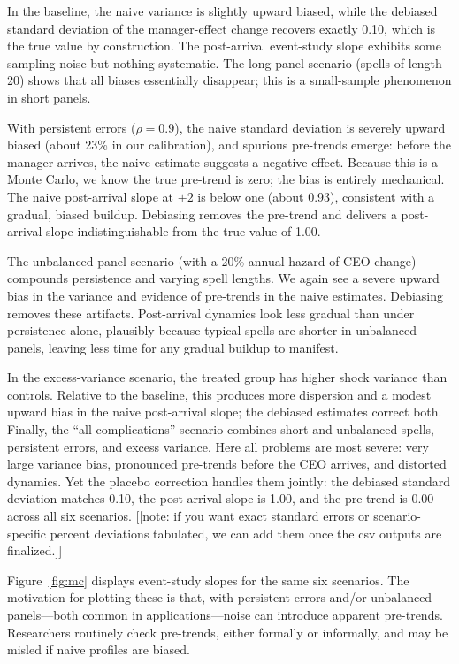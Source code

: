 \documentclass[11pt,a4paper]{article}
\begin{document}
In the baseline, the naive variance is slightly upward biased, while the debiased standard deviation of the manager-effect change recovers exactly 0.10, which is the true value by construction. The post-arrival event-study slope exhibits some sampling noise but nothing systematic. The long-panel scenario (spells of length 20) shows that all biases essentially disappear; this is a small-sample phenomenon in short panels.

With persistent errors ($\rho=0.9$), the naive standard deviation is severely upward biased (about 23\% in our calibration), and spurious pre-trends emerge: before the manager arrives, the naive estimate suggests a negative effect. Because this is a Monte Carlo, we know the true pre-trend is zero; the bias is entirely mechanical. The naive post-arrival slope at $+2$ is below one (about 0.93), consistent with a gradual, biased buildup. Debiasing removes the pre-trend and delivers a post-arrival slope indistinguishable from the true value of 1.00.

The unbalanced-panel scenario (with a 20\% annual hazard of CEO change) compounds persistence and varying spell lengths. We again see a severe upward bias in the variance and evidence of pre-trends in the naive estimates. Debiasing removes these artifacts. Post-arrival dynamics look less gradual than under persistence alone, plausibly because typical spells are shorter in unbalanced panels, leaving less time for any gradual buildup to manifest.

In the excess-variance scenario, the treated group has higher shock variance than controls. Relative to the baseline, this produces more dispersion and a modest upward bias in the naive post-arrival slope; the debiased estimates correct both. Finally, the “all complications” scenario combines short and unbalanced spells, persistent errors, and excess variance. Here all problems are most severe: very large variance bias, pronounced pre-trends before the CEO arrives, and distorted dynamics. Yet the placebo correction handles them jointly: the debiased standard deviation matches 0.10, the post-arrival slope is 1.00, and the pre-trend is 0.00 across all six scenarios. [[note: if you want exact standard errors or scenario-specific percent deviations tabulated, we can add them once the csv outputs are finalized.]]

Figure~\ref{fig:mc} displays event-study slopes for the same six scenarios. The motivation for plotting these is that, with persistent errors and/or unbalanced panels—both common in applications—noise can introduce apparent pre-trends. Researchers routinely check pre-trends, either formally or informally, and may be misled if naive profiles are biased.
\end{document}
